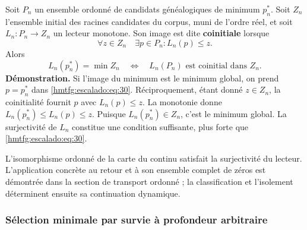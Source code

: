 Soit \(P_n\) un ensemble ordonné de candidats généalogiques de minimum \(p_n^*\). Soit \(Z_n\) l’ensemble initial des racines candidates du corpus, muni de l’ordre réel, et soit \(L_n:P_n\to Z_n\) un lecteur monotone. Son image est dite \textbf{coinitiale} lorsque
\begin{equation}
\forall z\in Z_n\quad\exists p\in P_n:
L_n(p)\le z.
\label{hmtfg:escalado:eq:30}
\end{equation}
Alors
\begin{equation}
\boxed{L_n(p_n^*)=\min Z_n
\quad\Longleftrightarrow\quad
L_n(P_n)\text{ est coinitial dans }Z_n.}
\label{hmtfg:escalado:eq:31}
\end{equation}
\textbf{Démonstration.} Si l’image du minimum est le minimum global, on prend \(p=p_n^*\) dans \eqref{hmtfg:escalado:eq:30}. Réciproquement, étant donné \(z\in Z_n\), la coinitialité fournit \(p\) avec \(L_n(p)\le z\). La monotonie donne \(L_n(p_n^*)\le L_n(p)\le z\). Puisque \(L_n(p_n^*)\in Z_n\), c’est le minimum global. La surjectivité de \(L_n\) constitue une condition suffisante, plus forte que \eqref{hmtfg:escalado:eq:30}.

L’isomorphisme ordonné de la carte du continu satisfait la surjectivité du lecteur. L’application concrète au retour et à son ensemble complet de zéros est démontrée dans la section de transport ordonné ; la classification et l’isolement déterminent ensuite sa continuation dynamique.

\subsubsection{Sélection minimale par survie à profondeur arbitraire}
\label{hmtfg:escalado:13.6}

